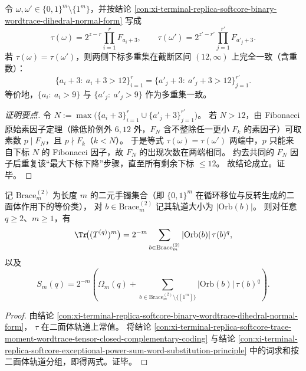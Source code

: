 \begin{corollary}\label{cor:xi-terminal-replica-softcore-fibonacci-primitive-divisor-high-index-rigidity}
令 \(\omega,\omega'\in\{0,1\}^m\setminus\{1^m\}\)，并按结论
\ref{con:xi-terminal-replica-softcore-binary-wordtrace-dihedral-normal-form}
写成
\[
\tau(\omega)=2^{z-r}\prod_{i=1}^{r}F_{a_i+3},
\qquad
\tau(\omega')=2^{z'-r'}\prod_{j=1}^{r'}F_{a'_j+3}.
\]
若 \(\tau(\omega)=\tau(\omega')\)，则两侧下标多重集在截断区间 \((12,\infty)\) 上完全一致（含重数）：
\[
\{a_i+3:\ a_i+3>12\}_{i=1}^{r}
=
\{a'_j+3:\ a'_j+3>12\}_{j=1}^{r'}.
\]
等价地，\(\{a_i:\ a_i>9\}\) 与 \(\{a'_j:\ a'_j>9\}\) 作为多重集一致。
\end{corollary}
\begin{proof}[证明要点]
令
\(
N:=\max\!\bigl(\{a_i+3\}_{i=1}^{r}\cup\{a'_j+3\}_{j=1}^{r'}\bigr)
\)。
若 \(N>12\)，由 Fibonacci 原始素因子定理（除低阶例外 \(6,12\) 外，\(F_N\) 含不整除任一更小 \(F_k\) 的素因子）可取素数 \(p\mid F_N\)，且 \(p\nmid F_k\)（\(k<N\)）。
于是等式 \(\tau(\omega)=\tau(\omega')\) 两端中，\(p\) 只能来自下标 \(N\) 的 Fibonacci 因子，故 \(F_N\) 的出现次数在两端相同。
约去共同的 \(F_N\) 因子后重复该“最大下标下降”步骤，直至所有剩余下标 \(\le 12\)。
故结论成立。证毕。
\end{proof}

\begin{proposition}[迹矩与例外幂和的二面体轨道压缩表示]\label{prop:xi-terminal-replica-softcore-dihedral-orbit-compression-trace-moments}
记 \(\mathrm{Brace}^{(2)}_m\) 为长度 \(m\) 的二元手镯集合（即 \(\{0,1\}^m\) 在循环移位与反转生成的二面体作用下的等价类），
对 \(b\in \mathrm{Brace}^{(2)}_m\) 记其轨道大小为 \(|\mathrm{Orb}(b)|\)。
则对任意 \(q\ge 2\)、\(m\ge 1\)，有
\[
\Tr\!\bigl((T^{(q)})^m\bigr)
=2^{-m}\sum_{b\in \mathrm{Brace}^{(2)}_m}
|\mathrm{Orb}(b)|\,\tau(b)^q,
\]
以及
\[
S_m(q)
=2^{-m}\!\left(
\Omega_m(q)+
\sum_{b\in \mathrm{Brace}^{(2)}_m\setminus\{[1^m]\}}
|\mathrm{Orb}(b)|\,\tau(b)^q
\right).
\]
\end{proposition}
\begin{proof}
由结论 \ref{con:xi-terminal-replica-softcore-binary-wordtrace-dihedral-normal-form}，
\(\tau\) 在二面体轨道上常值。
将结论
\ref{con:xi-terminal-replica-softcore-trace-moment-wordtrace-tensor-closed-complementary-coding}
与结论
\ref{con:xi-terminal-replica-softcore-exceptional-power-sum-word-substitution-principle}
中的词求和按二面体轨道分组，即得两式。证毕。
\end{proof}

\endinput
